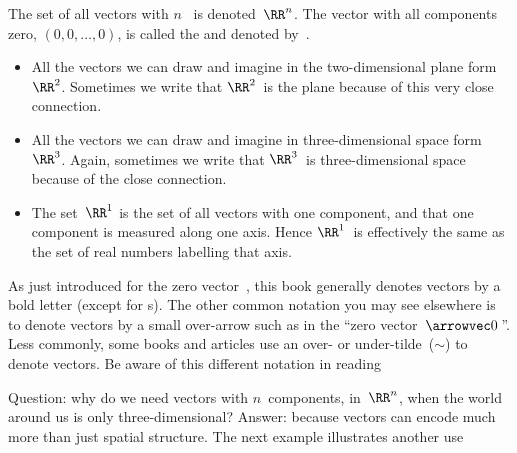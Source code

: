 \begin{definition} \label{def:rRn}
The set of all vectors with \(n\)~ is denoted~\(\RR^n\).
The vector with all components zero,  \((0,0,\ldots,0)\), is called the  and denoted by~\ov.
\end{definition}

\begin{example} 
\begin{itemize}
\item All the vectors we can draw and imagine in the two-dimensional plane form~\(\RR^2\).  
Sometimes we write that \(\RR^2\)~is the plane because of this very close connection.

\item All the vectors we can draw and imagine in three-dimensional space form~\(\RR^3\).  
Again, sometimes we write that \(\RR^3\)~is three-dimensional space because of the close connection. 

\item The set~\(\RR^1\) is the set of all vectors with one component, and that one component is measured along one axis.  
Hence \(\RR^1\)~is effectively the same as the set of real numbers labelling that axis.
\aqed
\end{itemize}
\end{example}


As just introduced for the zero vector~\ov, this book generally denotes vectors by a bold letter (except for s).
The other common notation you may see elsewhere is to denote vectors by a small over-arrow such as in the ``zero vector~\(\arrowvec0\)\,''.
Less commonly, some books and articles use an over- or under-tilde~(\(\sim\)) to denote vectors.
Be aware of this different notation in reading 



Question: why do we need vectors with \(n\)~components, in~\(\RR^n\), when the world around us is only three-dimensional?
Answer: because vectors can encode much more than just spatial structure.
The next example illustrates another use 


